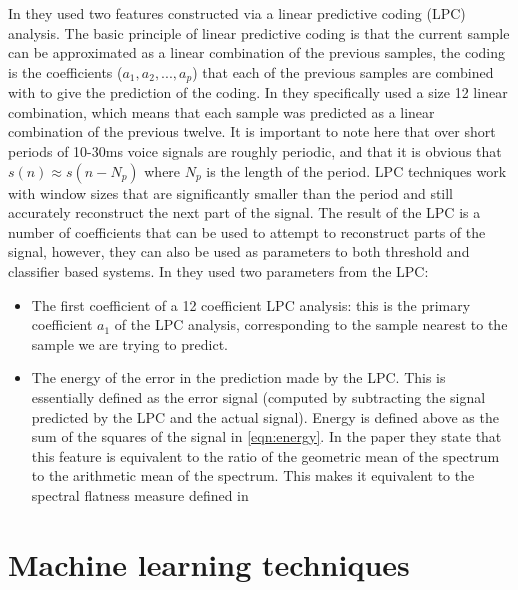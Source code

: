 \documentclass[ %
                    author={Sam Phippen},
                supervisor={Dr. Rafal Bogacz},
                     title={Real time voice activity detectors in noisy personal computing environments},
                  subtitle={},
                    degree={MEng},
                      year={2012} ]{thesis}
\begin{document}
In \cite{atal} they used two features constructed via a linear predictive
coding (LPC) analysis. The basic principle of linear predictive coding is that
the current sample can be approximated as a linear combination of the previous
samples\cite{rabiner}, the coding is the coefficients ($a_1,a_2,...,a_p$) that
each of the previous samples are combined with to give the prediction of the
coding. In \cite{atal} they specifically used a size 12 linear combination,
which means that each sample was predicted as a linear combination of the
previous twelve. It is important to note here that over short periods of
10-30ms voice signals are roughly periodic, and that it is obvious that $s(n)
\approx s(n-N_p)$ where $N_p$ is the length of the period. LPC techniques work
with window sizes that are significantly smaller than the period and still
accurately reconstruct the next part of the signal. The result of the LPC is a
number of coefficients that can be used to attempt to reconstruct parts of the
signal, however, they can also be used as parameters to both threshold and
classifier based systems. In \cite{atal} they used two parameters from the LPC:

\begin{itemize}

    \item The first coefficient of a 12 coefficient LPC analysis: this is the
        primary coefficient $a_1$ of the LPC analysis, corresponding to the
        sample nearest to the sample we are trying to predict.

    \item The energy of the error in the prediction made by the LPC. This is
        essentially defined as the error signal (computed by subtracting the
        signal predicted by the LPC and the actual signal). Energy is defined
        above as the sum of the squares of the signal in \ref{eqn:energy}. In
        the paper they state that this feature is equivalent to the ratio of
        the geometric mean of the spectrum to the arithmetic mean of the
        spectrum.  This makes it equivalent to the spectral flatness measure
        defined in \cite{moattar}

\end{itemize}

\section{Machine learning techniques}
\end{document}
